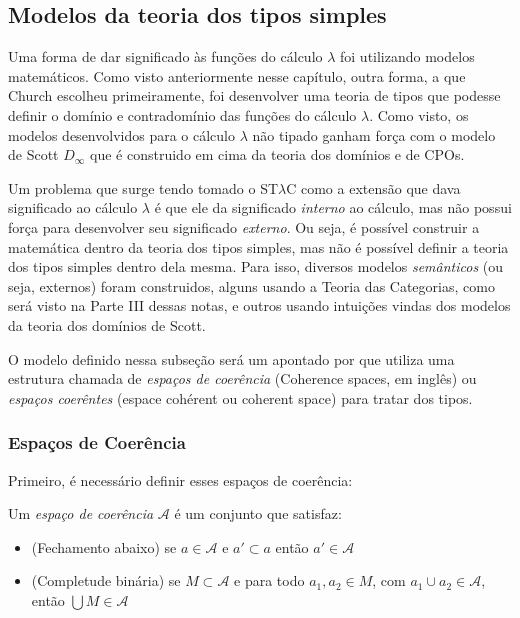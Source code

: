 \documentclass[../main.tex]{subfiles}
\begin{document}
\subsection{Modelos da teoria dos tipos simples}

Uma forma de dar significado às funções do cálculo $\lambda$ foi utilizando modelos matemáticos. Como visto anteriormente nesse capítulo, outra forma, a que Church escolheu primeiramente, foi desenvolver uma teoria de tipos que podesse definir o domínio e contradomínio das funções do cálculo $\lambda$. Como visto, os modelos desenvolvidos para o cálculo $\lambda$ não tipado ganham força com o modelo de Scott $D_{\infty}$ que é construido em cima da teoria dos domínios e de CPOs.

Um problema que surge tendo tomado o ST$\lambda$C como a extensão que dava significado ao cálculo $\lambda$ é que ele da significado \emph{interno} ao cálculo, mas não possui força para desenvolver seu significado \emph{externo}. Ou seja, é possível construir a matemática dentro da teoria dos tipos simples, mas não é possível definir a teoria dos tipos simples dentro dela mesma. Para isso, diversos modelos \emph{semânticos} (ou seja, externos) foram construidos, alguns usando a Teoria das Categorias, como será visto na Parte III dessas notas, e outros usando intuições vindas dos modelos da teoria dos domínios de Scott.

O modelo definido nessa subseção será um apontado por \cite{girard1989} que utiliza uma estrutura chamada de \emph{espaços de coerência} (Coherence spaces, em inglês) ou \emph{espaços coerêntes} (espace cohérent ou coherent space) para tratar dos tipos.

\subsubsection{Espaços de Coerência}

Primeiro, é necessário definir esses espaços de coerência:

\begin{definition}
    Um \emph{espaço de coerência} $\mathcal{A}$ é um conjunto que satisfaz:
    \begin{itemize}
        \item (Fechamento abaixo) se $a \in \mathcal{A}$ e $a' \subset a$ então $a' \in \mathcal{A}$
        \item (Completude binária) se $M \subset \mathcal{A}$ e para todo $a_1, a_2 \in M$, com $a_1 \cup a_2 \in \mathcal{A}$, então $\bigcup M \in \mathcal{A}$
    \end{itemize}
\end{definition}
\end{document}
